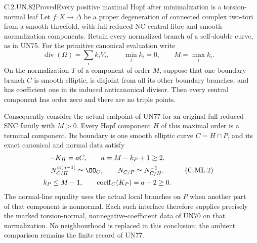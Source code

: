 \begin{statement}{C.2.UN.82}{Proved}{Every positive maximal Hopf after minimalization is a torsion-normal leaf}
Let \(f:X\to\Delta\) be a proper degeneration of connected
complex two-tori from a smooth threefold, with full reduced
NC central fibre and smooth normalization components. Retain
every normalized branch of a self-double curve, as in UN75.
For the primitive canonical evaluation write
\[
       \operatorname{div}(\Omega)=\sum_i k_iV_i,
       \qquad \min_i k_i=0,\qquad M=\max_i k_i .
\tag{C.ML.1}
\]
On the normalization \(T\) of a component of order \(M\),
suppose that one boundary branch \(C\) is smooth elliptic,
is disjoint from all its other boundary branches, and has
coefficient one in its induced anticanonical divisor.
Then every central component has order zero and there
are no triple points.

Consequently consider the actual endpoint of UN77 for
an original full reduced SNC family with \(M>0\).
Every Hopf component \(H\) of this maximal order is a
terminal component. Its boundary is one smooth elliptic
curve \(C=H\cap P\), and its exact canonical and normal
data satisfy
\[
 \begin{gathered}
       -K_H=aC,\qquad a=M-k_P+1\ge2,\\
       N_{C/H}^{\otimes(a-1)}\simeq\OO_C,
       \qquad N_{C/P}\simeq N_{C/H}^{-1},\\
       k_P\le M-1,\qquad
       \operatorname{coeff}_C(K_P)=a-2\ge0 .
 \end{gathered}
\tag{C.ML.2}
\]
The normal-line equality uses the actual local branches
on \(P\) when another part of that component is nonnormal.
Each such interface therefore supplies precisely the
marked torsion-normal, nonnegative-coefficient data of
UN70 on that normalization. No neighbourhood is replaced
in this conclusion; the ambient comparison remains the
finite record of UN77.
\end{statement}


